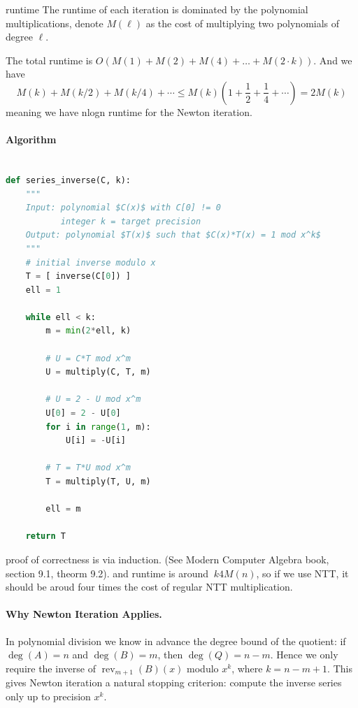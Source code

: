 \begin{notice} {runtime}
  The runtime of each iteration is dominated by the polynomial multiplications, denote $M(\ell)$ as the cost of multiplying two polynomials of degree $\ell$.

  The total runtime is \(O(M(1) + M(2) + M(4) + \dots + M(2\cdot k))\). And we have
  \[
  M(k) + M(k/2) + M(k/4) + \cdots \leq M(k)\left(1 + \frac{1}{2} + \frac{1}{4} + \cdots\right) = 2M(k)
  \]
  meaning we have nlogn runtime for the Newton iteration.
\end{notice}

\paragraph{Algorithm}
\begin{lstlisting}[language=Python,
  caption={Newton iteration for polynomial series inverse},
]

def series_inverse(C, k):
    """
    Input: polynomial $C(x)$ with C[0] != 0
           integer k = target precision
    Output: polynomial $T(x)$ such that $C(x)*T(x) = 1 mod x^k$
    """
    # initial inverse modulo x
    T = [ inverse(C[0]) ]  
    ell = 1

    while ell < k:
        m = min(2*ell, k)

        # U = C*T mod x^m
        U = multiply(C, T, m)

        # U = 2 - U mod x^m
        U[0] = 2 - U[0]
        for i in range(1, m):
            U[i] = -U[i]

        # T = T*U mod x^m
        T = multiply(T, U, m)

        ell = m

    return T
\end{lstlisting}

proof of correctness is via induction. (See Modern Computer Algebra book, section 9.1, theorm 9.2).
and runtime is around $~k4M(n)$, so if we use NTT, it should be aroud four times the cost of regular NTT multiplication.

\paragraph{Why Newton Iteration Applies.}
In polynomial division we know in advance the degree bound of the quotient:
if $\deg(A)=n$ and $\deg(B)=m$, then $\deg(Q)=n-m$. Hence we only require
the inverse of $\operatorname{rev}_{m+1}(B)(x)$ modulo $x^k$, where
$k = n-m+1$. This gives Newton iteration a natural stopping criterion:
compute the inverse series only up to precision $x^k$.



